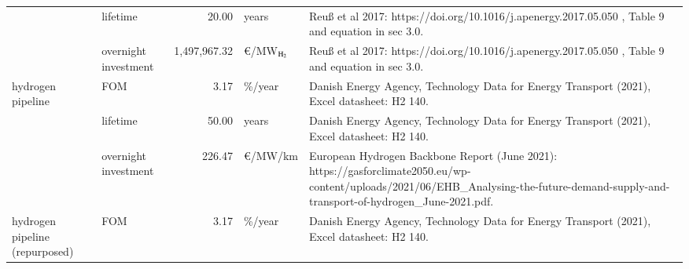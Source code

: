 \begin{longtable}{p{4cm}p{4cm}rp{3cm}p{10cm}}
                      & lifetime &        20.00 &                         years &                                                                                                                                                                                                                                   Reuß et al 2017: https://doi.org/10.1016/j.apenergy.2017.05.050 , Table 9 and equation in sec 3.0. \\
                      & overnight investment & 1,497,967.32 &          \euro/MW$_{\ce{H2}}$ &                                                                                                                                                                                                                                   Reuß et al 2017: https://doi.org/10.1016/j.apenergy.2017.05.050 , Table 9 and equation in sec 3.0. \\
hydrogen pipeline & FOM &         3.17 &                       \%/year &                                                                                                                                                                                                                                          Danish Energy Agency, Technology Data for Energy Transport (2021), Excel datasheet: H2 140. \\
                      & lifetime &        50.00 &                         years &                                                                                                                                                                                                                                          Danish Energy Agency, Technology Data for Energy Transport (2021), Excel datasheet: H2 140. \\
                      & overnight investment &       226.47 &                   \euro/MW/km &                                                                                                                                             European Hydrogen Backbone Report (June 2021): https://gasforclimate2050.eu/wp-content/uploads/2021/06/EHB\_Analysing-the-future-demand-supply-and-transport-of-hydrogen\_June-2021.pdf. \\
hydrogen pipeline (repurposed) & FOM &         3.17 &                       \%/year &                                                                                                                                                                                                                                          Danish Energy Agency, Technology Data for Energy Transport (2021), Excel datasheet: H2 140. \\

\end{longtable}

